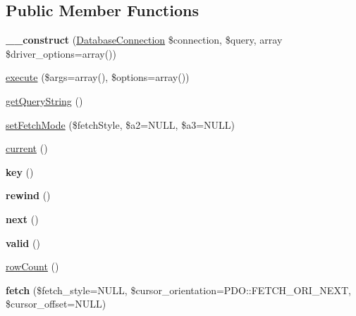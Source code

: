 \subsection*{Public Member Functions}
\begin{DoxyCompactItemize}
\item 
\hypertarget{classDatabaseStatementPrefetch_a0cb1e9cf654adc4c3723e830bd9c7442}{
{\bfseries \_\-\_\-construct} (\hyperlink{classDatabaseConnection}{DatabaseConnection} \$connection, \$query, array \$driver\_\-options=array())}
\label{classDatabaseStatementPrefetch_a0cb1e9cf654adc4c3723e830bd9c7442}

\item 
\hyperlink{classDatabaseStatementPrefetch_a302e9f0e9aa09e2a8ccd7bd17679f8cd}{execute} (\$args=array(), \$options=array())
\item 
\hyperlink{classDatabaseStatementPrefetch_ae5a57e570b7c999b8b4c8b42c636d1af}{getQueryString} ()
\item 
\hyperlink{classDatabaseStatementPrefetch_a98cfac25b6be286e48f942d4b0d0d880}{setFetchMode} (\$fetchStyle, \$a2=NULL, \$a3=NULL)
\item 
\hyperlink{classDatabaseStatementPrefetch_a84091d922961e144db757e33fe4f842e}{current} ()
\item 
\hypertarget{classDatabaseStatementPrefetch_aed29aa120fef9bacc6e225f20fab18bf}{
{\bfseries key} ()}
\label{classDatabaseStatementPrefetch_aed29aa120fef9bacc6e225f20fab18bf}

\item 
\hypertarget{classDatabaseStatementPrefetch_ac22e2ea8b66066d275f63b249a916fee}{
{\bfseries rewind} ()}
\label{classDatabaseStatementPrefetch_ac22e2ea8b66066d275f63b249a916fee}

\item 
\hypertarget{classDatabaseStatementPrefetch_a86f2cda7cd66190b293b797396303757}{
{\bfseries next} ()}
\label{classDatabaseStatementPrefetch_a86f2cda7cd66190b293b797396303757}

\item 
\hypertarget{classDatabaseStatementPrefetch_af9c05113047dd78c99ffc2094903c4e1}{
{\bfseries valid} ()}
\label{classDatabaseStatementPrefetch_af9c05113047dd78c99ffc2094903c4e1}

\item 
\hyperlink{classDatabaseStatementPrefetch_a03f64ac0f61a386a4f5a87540d254fa1}{rowCount} ()
\item 
\hypertarget{classDatabaseStatementPrefetch_aa71d170afb9a944de1c29f2e2fe20d28}{
{\bfseries fetch} (\$fetch\_\-style=NULL, \$cursor\_\-orientation=PDO::FETCH\_\-ORI\_\-NEXT, \$cursor\_\-offset=NULL)}
\label{classDatabaseStatementPrefetch_aa71d170afb9a944de1c29f2e2fe20d28}


\end{DoxyCompactItemize}
